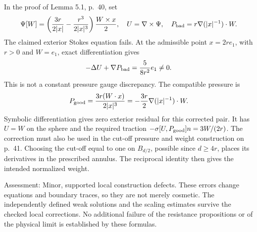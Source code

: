 \documentclass[10pt]{article}
\begin{document}
In the proof of Lemma 5.1, p. 40, set \[\Psi[W]=\left(\frac{3r}{2|x|}-\frac{r^3}{2|x|^3}\right)
                 \frac{W\times x}{2},\quad
 U=\nabla\times\Psi,\quad
 P_{\rm bad}=r\nabla(|x|^{-1})\cdot W .\] The claimed exterior Stokes equation fails. At the admissible point \(x=2re_1\), with \(r>0\) and \(W=e_1\), exact differentiation gives \[-\Delta U+\nabla P_{\rm bad}=\frac{5}{8r^2}e_1\ne0.\] This is not a constant pressure gauge discrepancy. The compatible pressure is \[P_{\rm good}=\frac{3r(W\cdot x)}{2|x|^3}
            =-\frac{3r}{2}\nabla(|x|^{-1})\cdot W .\] Symbolic differentiation gives zero exterior residual for this corrected pair. It has \(U=W\) on the sphere and the required traction \(-\sigma[U,P_{\rm good}]n=3W/(2r)\). The correction must also be used in the cut-off pressure and weight construction on p. 41. Choosing the cut-off equal to one on \(B_{d/2}\), possible since \(d\ge4r\), places its derivatives in the prescribed annulus. The reciprocal identity then gives the intended normalized weight.\par
Assessment: Minor, supported local construction defects. These errors change equations and boundary traces, so they are not merely cosmetic. The independently defined weak solutions and the scaling estimates survive the checked local corrections. No additional failure of the resistance propositions or of the physical limit is established by these formulas.\par
\end{document}
